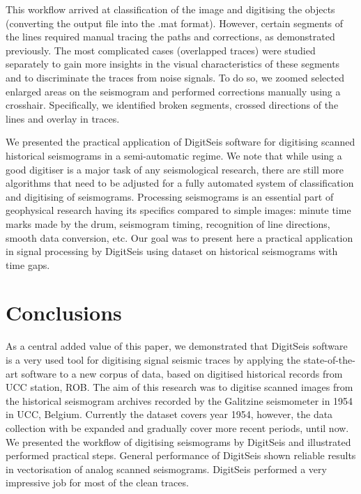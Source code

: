 \documentclass[informatics,article,submit,moreauthors,pdftex]{Definitions/mdpi}
\begin{document}
This workflow arrived at classification of the image and digitising the objects (converting the output file into the .mat format). However, certain segments of the lines required manual tracing the paths and corrections, as demonstrated previously. The most complicated cases (overlapped traces) were studied separately to gain more insights in the visual characteristics of these segments and to discriminate the traces from noise signals. To do so, we zoomed selected enlarged areas on the seismogram and performed corrections manually using a crosshair. Specifically, we identified broken segments, crossed directions of the lines and overlay in traces. 

We presented the practical application of DigitSeis software for digitising scanned historical seismograms in a semi-automatic regime. We note that while using a good digitiser is a major task of any seismological research, there are still more algorithms that need to be adjusted for a fully automated system of classification and digitising of seismograms. Processing seismograms is an essential part of geophysical research having its specifics compared to simple images: minute time marks made by the drum, seismogram timing, recognition of line directions, smooth data conversion, etc. Our goal was to present here a practical application in signal processing by DigitSeis using dataset on historical seismograms with time gaps.

\section{Conclusions}

As a central added value of this paper, we demonstrated that DigitSeis software is a very used tool for digitising signal seismic traces by applying the state-of-the-art software to a new corpus of data, based on digitised historical records from \ac{UCC} station, \ac{ROB}. The aim of this research was to digitise scanned images from the historical seismogram archives recorded by the Galitzine seismometer in 1954 in \ac{UCC}, Belgium. Currently the dataset covers year 1954, however, the data collection with be expanded and gradually cover more recent periods, until now. We presented the workflow of digitising seismograms by DigitSeis and illustrated performed practical steps. General performance of DigitSeis shown reliable results in vectorisation of analog scanned seismograms. DigitSeis performed a very impressive job for most of the clean traces. 
\end{document}
